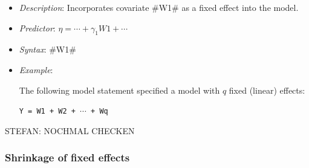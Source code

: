 \begin{itemize}
\item[] {\em Description}: Incorporates covariate #W1# as a fixed effect into the model.
\item[] {\em Predictor}: $\eta =  \cdots + \gamma_1 W1 + \cdots$
\item[] {\em Syntax}: #W1#
\item[] {\em Example}:

The following model statement specified a model with $q$ fixed
(linear) effects:

\texttt{Y = W1 + W2 + $\cdots$ + Wq}
\end{itemize}

STEFAN: NOCHMAL CHECKEN
\subsubsection*{Shrinkage of fixed effects}

